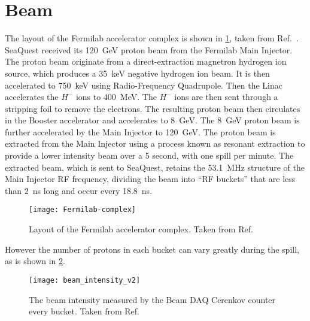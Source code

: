 \documentclass[../main.tex]{subfiles}
\begin{document}
\section{Beam}
The layout of the Fermilab accelerator complex is shown in \cref{fig:complex},
taken from Ref.~\cite{concept-book}.
SeaQuest received its \SI{120}{\GeV} proton beam from the Fermilab Main Injector.
The proton beam originate from a direct-extraction magnetron hydrogen ion source,
which produces a \SI{35}{\keV} negative hydrogen ion beam. It is then accelerated
to \SI{750}{\keV} using Radio-Frequency Quadrupole. Then the Linac accelerates the
$H^-$ ions to \SI{400}{\MeV}. The $H^-$ ions are then sent through a stripping foil
to remove the electrons. The resulting proton beam then circulates in the Booster
accelerator and accelerates to \SI{8}{\GeV}. The \SI{8}{\GeV} proton beam is
further accelerated by the Main Injector to \SI{120}{\GeV}. The proton beam is
extracted from the Main Injector using a process known as resonant extraction to
provide a lower intensity beam over a 5 second, with one spill per minute. The extracted beam, which
is sent to SeaQuest, retains the \SI{53.1}{\MHz} structure of the Main
Injector RF frequency, dividing the beam into ``RF buckets'' that are less than
\SI{2}{\ns} long and occur every \SI{18.8}{\ns}.
\begin{figure}[htbp!]
	\centering
	\texttt{[image: Fermilab-complex]}
	\caption{Layout of the Fermilab accelerator complex. Taken from Ref.~\cite{concept-book}}
	\label{fig:complex}
\end{figure}
However the number of protons in each bucket can vary greatly during the spill, as
is shown in \cref{fig:intensity}.
\begin{figure}[htpb!]
	\centering
	\texttt{[image: beam\_intensity\_v2]}
	\caption{The beam intensity measured by the Beam DAQ Cerenkov counter every
		bucket. Taken from Ref.~\cite{aidala2019}}
	\label{fig:intensity}
\end{figure}
\end{document}
